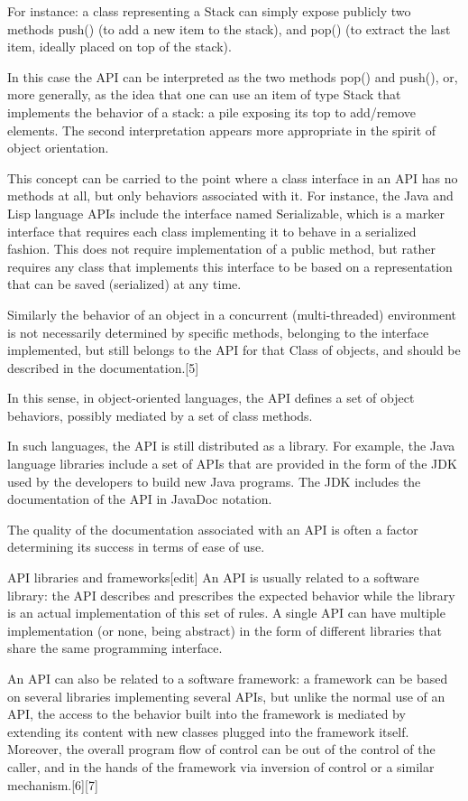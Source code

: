For instance: a class representing a Stack can simply expose publicly two methods push() (to add a new item to the stack), and pop() (to extract the last item, ideally placed on top of the stack).

In this case the API can be interpreted as the two methods pop() and push(), or, more generally, as the idea that one can use an item of type Stack that implements the behavior of a stack: a pile exposing its top to add/remove elements. 
The second interpretation appears more appropriate in the spirit of object orientation.

This concept can be carried to the point where a class interface in an API has no methods at all, but only behaviors associated with it.
 For instance, the Java and Lisp language APIs include the interface named Serializable, which is a marker interface that requires each class implementing it to behave in a serialized fashion. 
 This does not require implementation of a public method, but rather requires any class that implements this interface to be based on a representation that can be saved (serialized) at any time.

Similarly the behavior of an object in a concurrent (multi-threaded) environment is not necessarily determined by specific methods, belonging to the interface implemented, but still belongs to the API for that Class of objects, and should be described in the documentation.[5]

In this sense, in object-oriented languages, the API defines a set of object behaviors, possibly mediated by a set of class methods.

In such languages, the API is still distributed as a library. For example, the Java language libraries include a set of APIs that are provided in the form of the JDK used by the developers to build new Java programs. 
The JDK includes the documentation of the API in JavaDoc notation.

The quality of the documentation associated with an API is often a factor determining its success in terms of ease of use.

API libraries and frameworks[edit]
An API is usually related to a software library: the API describes and prescribes the expected behavior while the library is an actual implementation of this set of rules.
 A single API can have multiple implementation (or none, being abstract) in the form of different libraries that share the same programming interface.

An API can also be related to a software framework: a framework can be based on several libraries implementing several APIs, but unlike the normal use of an API, the access to the behavior built into the framework is mediated by extending its content with new classes plugged into the framework itself. 
Moreover, the overall program flow of control can be out of the control of the caller, and in the hands of the framework via inversion of control or a similar mechanism.[6][7]

